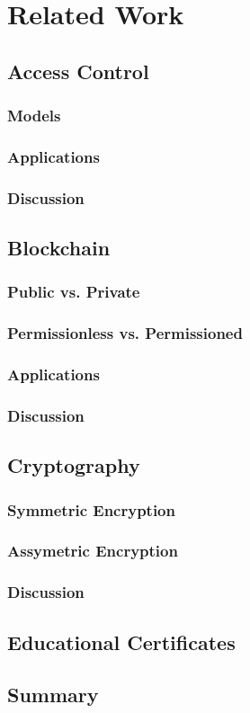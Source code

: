 \chapter{Related Work}

\section{Access Control}

\subsection{Models}

\subsection{Applications}

\subsection{Discussion}

\section{Blockchain}

\subsection{Public vs. Private}

\subsection{Permissionless vs. Permissioned}

\subsection{Applications}

\subsection{Discussion}

\section{Cryptography}

\subsection{Symmetric Encryption}

\subsection{Assymetric Encryption}

\subsection{Discussion}

\section{Educational Certificates}

\section{Summary}

